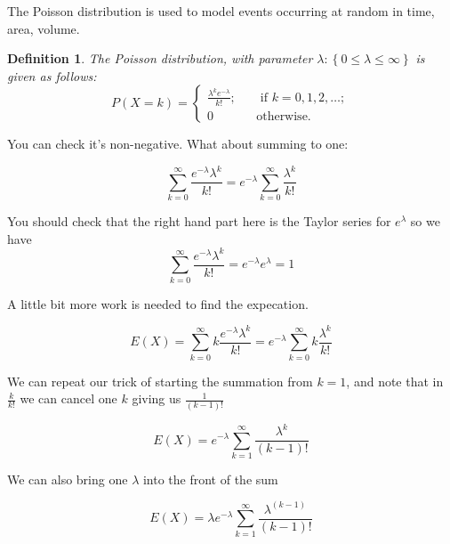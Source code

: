 \documentclass[12pt]{extbook}
\newtheorem{df}{Definition}[section]
\begin{document}
The Poisson distribution is used to model events occurring at random in time, area, volume.

\begin{df}
The Poisson distribution, with parameter $\lambda: \left\{0 \leq \lambda \leq \infty \right\}$ is given as follows:
\begin{displaymath}
P(X=k) = \left\{ \begin{array}{crr} \frac{\lambda^k e^{-\lambda}}{k!}; & & \mbox{ if } k=0,1,2,\ldots; \\ 0 & & \mbox{otherwise.} \end{array} \right.
\end{displaymath}
\end{df}



You can check it's non-negative.   What about summing to one:

\begin{displaymath}
\sum_{k=0}^{\infty} \frac{e^{-\lambda}\lambda^k}{k!} = e^{-\lambda} \sum_{k=0}^{\infty} \frac{\lambda^k}{k!}
\end{displaymath}

You should check that the right hand part here is the Taylor series for $e^{\lambda}$ so we have
\begin{displaymath}
\sum_{k=0}^{\infty} \frac{e^{-\lambda}\lambda^k}{k!} = e^{-\lambda}e^{\lambda} = 1
\end{displaymath}



A little bit more work is needed to find the expecation.

\begin{displaymath}
E(X) = \sum_{k=0}^{\infty} k \frac{e^{-\lambda}\lambda^k}{k!} = e^{-\lambda} \sum_{k=0}^{\infty} k \frac{\lambda^k}{k!}
\end{displaymath}

We can repeat our trick of starting the summation from $k=1$, and note that in $\frac{k}{k!}$ we can cancel one $k$ giving us $\frac{1}{(k-1)!}$

\begin{displaymath}
E(X)  = e^{-\lambda} \sum_{k=1}^{\infty}  \frac{\lambda^k}{(k-1)!}
\end{displaymath}

We can also bring one $\lambda$ into the front of the sum

\begin{displaymath}
E(X)  = \lambda e^{-\lambda} \sum_{k=1}^{\infty}  \frac{\lambda^{(k-1)}}{(k-1)!}
\end{displaymath}
\end{document}
